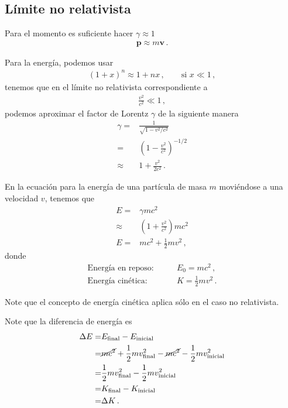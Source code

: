 \documentclass[11pt,a4paper]{book}
\begin{document}
\subsection{Límite no relativista}

Para el momento es suficiente hacer $\gamma \approx 1$
\begin{align}
    \boldsymbol{p} \approx m \boldsymbol{v}\,.
\end{align}


Para la energía, podemos usar
\begin{align*}
    (1+x)^n \approx 1+nx\,,\qquad\text{si $x\ll 1$}\,,
\end{align*}
tenemos que en el límite no relativista correspondiente a 
\begin{align*}
    \frac{v^2}{c^2} \ll 1\,,
\end{align*}
podemos aproximar el factor de Lorentz $\gamma$ de la siguiente manera
\begin{align}
    \gamma =&\frac{1}{\sqrt{1-v^2/c^2}}\nonumber\\
    =& \left(1-\frac{v^2}{c^2}\right)^{-1/2}\nonumber\\
    \approx& 1+\frac{v^2}{2c^2}\,.
\end{align}


En la ecuación para la energía de una partícula de masa $m$ moviéndose a una velocidad $v$, tenemos que
\begin{align*}
    E =& \gamma m c^2\nonumber\\
     \approx& \left(1+\frac{v^2}{c^2}\right)mc^2\nonumber\\
      E=&mc^2 + \frac{1}{2}m v^2\,,
\end{align*}
donde 
\begin{align}
    \text{Energía en reposo:}\qquad& E_0 = mc^2\,,\\
     \text{Energía cinética:}\qquad& K = \frac{1}{2}mv^2\,.
\end{align}

Note que el concepto de energía cinética aplica sólo en el caso no relativista.

Note que la diferencia de energía es
\begin{align}
    \Delta E =& E_{\text{final}} -E_{\text{inicial}} \nonumber\\
    =& \cancel{mc^2} + \frac{1}{2}mv^2_{\text{final}} -\cancel{mc^2} - \frac{1}{2}mv^2_{\text{inicial}}\nonumber\\
=& \frac{1}{2}mv^2_{\text{final}} - \frac{1}{2}mv^2_{\text{inicial}}\nonumber\\
=& K_\text{final} -K_\text{inicial} \nonumber\\
=& \Delta K\,.
\end{align}
\end{document}
